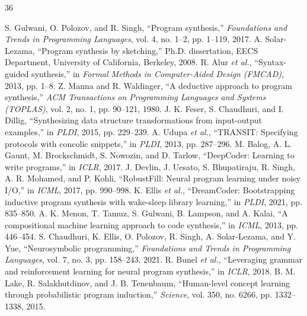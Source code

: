 \documentclass[10pt,twocolumn]{article}
\begin{document}

\begingroup
\let\oldbibitem\bibitem
\renewcommand{\bibitem}[1]{\vspace{-0.6pt}\oldbibitem{#1}}
\begin{thebibliography}{36}
\scriptsize
\sloppy
\setlength{\itemsep}{0pt}
\setlength{\parsep}{0pt}

 S. Gulwani, O. Polozov, and R. Singh, ``Program synthesis,'' \emph{Foundations and Trends in Programming Languages}, vol. 4, no. 1--2, pp. 1--119, 2017.
 A. Solar-Lezama, ``Program synthesis by sketching,'' Ph.D. dissertation, EECS Department, University of California, Berkeley, 2008.
 R. Alur \emph{et al.}, ``Syntax-guided synthesis,'' in \emph{Formal Methods in Computer-Aided Design (FMCAD)}, 2013, pp. 1--8.
 Z. Manna and R. Waldinger, ``A deductive approach to program synthesis,'' \emph{ACM Transactions on Programming Languages and Systems (TOPLAS)}, vol. 2, no. 1, pp. 90--121, 1980.
 J. K. Feser, S. Chaudhuri, and I. Dillig, ``Synthesizing data structure transformations from input-output examples,'' in \emph{PLDI}, 2015, pp. 229--239.
 A. Udupa \emph{et al.}, ``TRANSIT: Specifying protocols with concolic snippets,'' in \emph{PLDI}, 2013, pp. 287--296.
 M. Balog, A. L. Gaunt, M. Brockschmidt, S. Nowozin, and D. Tarlow, ``DeepCoder: Learning to write programs,'' in \emph{ICLR}, 2017.
 J. Devlin, J. Uesato, S. Bhupatiraju, R. Singh, A. R. Mohamed, and P. Kohli, ``RobustFill: Neural program learning under noisy I/O,'' in \emph{ICML}, 2017, pp. 990--998.
 K. Ellis \emph{et al.}, ``DreamCoder: Bootstrapping inductive program synthesis with wake-sleep library learning,'' in \emph{PLDI}, 2021, pp. 835--850.
 A. K. Menon, T. Tamuz, S. Gulwani, B. Lampson, and A. Kalai, ``A compositional machine learning approach to code synthesis,'' in \emph{ICML}, 2013, pp. 446--454.
 S. Chaudhuri, K. Ellis, O. Polozov, R. Singh, A. Solar-Lezama, and Y. Yue, ``Neurosymbolic programming,'' \emph{Foundations and Trends in Programming Languages}, vol. 7, no. 3, pp. 158--243, 2021.
 R. Bunel \emph{et al.}, ``Leveraging grammar and reinforcement learning for neural program synthesis,'' in \emph{ICLR}, 2018.
 B. M. Lake, R. Salakhutdinov, and J. B. Tenenbaum, ``Human-level concept learning through probabilistic program induction,'' \emph{Science}, vol. 350, no. 6266, pp. 1332--1338, 2015.

\end{thebibliography}
\end{document}
